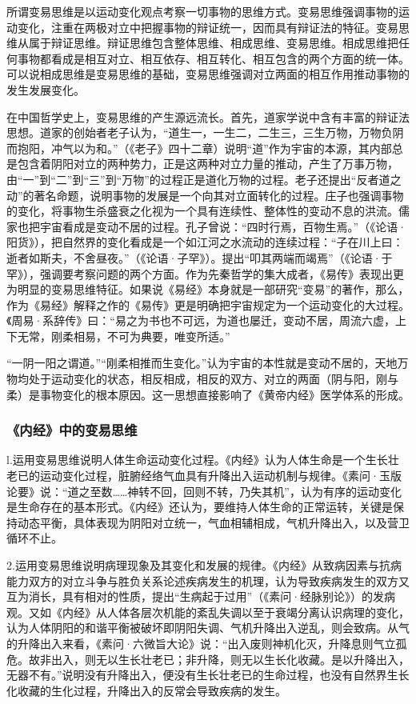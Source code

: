 \documentclass[draft,12pt]{ctexbook}
\begin{document}
所谓变易思维是以运动变化观点考察一切事物的思维方式。变易思维强调事物的运动变化，注重在两极对立中把握事物的辩证统一，因而具有辩证法的特征。变易思维从属于辩证思维。辩证思维包含整体思维、相成思维、变易思维。相成思维把任何事物都看成是相互对立、相互依存、相互转化、相互包含的两个方面的统一体。可以说相成思维是变易思维的基础，变易思维强调对立两面的相互作用推动事物的发生发展变化。

在中国哲学史上，变易思维的产生源远流长。首先，道家学说中含有丰富的辩证法思想。道家的创始者老子认为，“道生一，一生二，二生三，三生万物，万物负阴而抱阳，冲气以为和。”（《老子》四十二章）说明“道”作为宇宙的本源，其内部总是包含着阴阳对立的两种势力，正是这两种对立力量的推动，产生了万事万物，由“一”到“二”到“三”到“万物”的过程正是道化万物的过程。老子还提出“反者道之动”的著名命题，说明事物的发展是一个向其对立面转化的过程。庄子也强调事物的变化，将事物生杀盛衰之化视为一个具有连续性、整体性的变动不息的洪流。儒家也把宇宙看成是变动不居的过程。孔子曾说：“四时行焉，百物生焉。”（《论语·阳货》），把自然界的变化看成是一个如江河之水流动的连续过程：“子在川上曰：逝者如斯夫，不舍昼夜。”（《论语·子罕》）。提出“叩其两端而竭焉”（《论语·于罕》），强调要考察问题的两个方面。作为先秦哲学的集大成者，《易传》表现出更为明显的变易思维特征。如果说《易经》本身就是一部研究“变易”的著作，那么，作为《易经》解释之作的《易传》更是明确把宇宙规定为一个运动变化的大过程。《周易·系辞传》曰：“易之为书也不可远，为道也屡迁，变动不居，周流六虚，上下无常，刚柔相易，不可为典要，唯变所适。”

“一阴一阳之谓道。”“刚柔相推而生变化。”认为宇宙的本性就是变动不居的，天地万物均处于运动变化的状态，相反相成，相反的双方、对立的两面（阴与阳，刚与柔）是事物变化的根本原因。这一思想直接影响了《黄帝内经》医学体系的形成。

\subsubsection{《内经》中的变易思维}%

l.运用变易思维说明人体生命运动变化过程。《内经》认为人体生命是一个生长壮老已的运动变化过程，脏腑经络气血具有升降出入运动机制与规律。《素问·玉版论要》说：“道之至数……神转不回，回则不转，乃失其机”，认为有序的运动变化是生命存在的基本形式。《内经》还认为，要维持人体生命的正常运转，关键是保持动态平衡，具体表现为阴阳对立统一，气血相辅相成，气机升降出入，以及营卫循环不止。

2.运用变易思维说明病理现象及其变化和发展的规律。《内经》从致病因素与抗病能力双方的对立斗争与胜负关系论述疾病发生的机理，认为导致疾病发生的双方又互为消长，具有相对的性质，提出“生病起于过用”（《素问·经脉别论》）的发病观。又如《内经》从人体各层次机能的紊乱失调以至于衰竭分离认识病理的变化，认为人体阴阳的和谐平衡被破坏即阴阳失调、气机升降出入逆乱，则会致病。从气的升降出入来看，《素问·六微旨大论》说：“出入废则神机化灭，升降息则气立孤危。故非出入，则无以生长壮老已；非升降，则无以生长化收藏。是以升降出入，无器不有。”说明没有升降出入，便没有生长壮老已的生命过程，也没有自然界生长化收藏的生化过程，升降出入的反常会导致疾病的发生。
\end{document}
